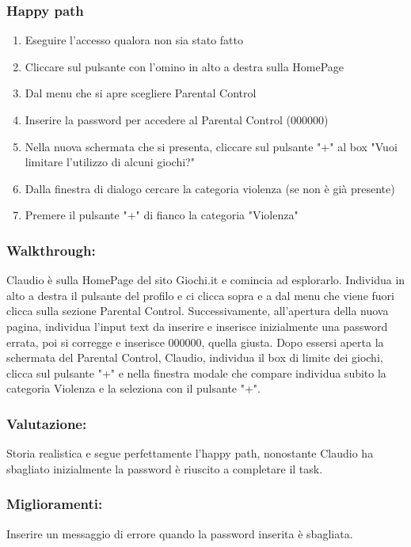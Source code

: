 \documentclass[../Report.tex]{subfiles}
\begin{document}
    \subsubsection{Happy path}
    \begin{enumerate}
        \item Eseguire l'accesso qualora non sia stato fatto 
        \item Cliccare sul pulsante con l’omino in alto a destra sulla HomePage
        \item Dal menu che si apre scegliere Parental Control
        \item Inserire la password per accedere al Parental Control (000000)
        \item Nella nuova schermata che si presenta, cliccare sul pulsante "+" al box "Vuoi limitare l'utilizzo di alcuni giochi?"
        \item Dalla finestra di dialogo cercare la categoria violenza (se non è già presente)
        \item Premere il pulsante "+" di fianco la categoria "Violenza"
    \end{enumerate}

    \subsubsection{Walkthrough:}
    Claudio è sulla HomePage del sito Giochi.it e comincia ad esplorarlo. Individua in alto a destra il pulsante del profilo e ci clicca sopra e a dal menu che viene fuori clicca sulla sezione Parental Control. Successivamente, all'apertura della nuova pagina, individua l'input text da inserire e inserisce inizialmente una password errata, poi si corregge e inserisce 000000, quella giusta. Dopo essersi aperta la schermata del Parental Control, Claudio, individua il box di limite dei giochi, clicca sul pulsante "+" e nella finestra modale che compare individua subito la categoria Violenza e la seleziona con il pulsante "+".  
    \subsubsection{Valutazione:}
    Storia realistica e segue perfettamente l’happy path, nonostante Claudio ha sbagliato inizialmente la password è riuscito a completare il task. 

    \subsubsection{Miglioramenti:}
    Inserire un messaggio di errore quando la password inserita è sbagliata.
\end{document}
